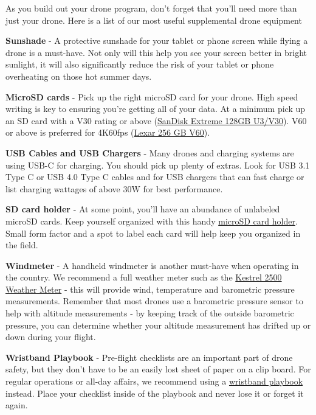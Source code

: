 \documentclass[
  12pt,
]{book}
\begin{document}
As you build out your drone program, don't forget that you'll need more than just your drone. Here is a list of our most useful supplemental drone equipment

\textbf{Sunshade} - A protective sunshade for your tablet or phone screen while flying a drone is a must-have. Not only will this help you see your screen better in bright sunlight, it will also significantly reduce the risk of your tablet or phone overheating on those hot summer days.

\textbf{MicroSD cards} - Pick up the right microSD card for your drone. High speed writing is key to ensuring you're getting all of your data. At a minimum pick up an SD card with a V30 rating or above (\href{https://www.amazon.com/SanDisk-Extreme-microSDXC-Memory-Adapter/dp/B07FCMKK5X?th=1}{SanDisk Extreme 128GB U3/V30}). V60 or above is preferred for 4K60fps (\href{https://www.amazon.com/Lexar-microSDXC-Professional-Adapter-Class10/dp/B09FJHMLC6/}{Lexar 256 GB V60}).

\textbf{USB Cables and USB Chargers} - Many drones and charging systems are using USB-C for charging. You should pick up plenty of extras. Look for USB 3.1 Type C or USB 4.0 Type C cables and for USB chargers that can fast charge or list charging wattages of above 30W for best performance.

\textbf{SD card holder} - At some point, you'll have an abundance of unlabeled microSD cards. Keep yourself organized with this handy \href{https://www.amazon.com/Holder-Storage-Organizer-Lightweight-Portable/dp/B07T6SWXK5/}{microSD card holder}. Small form factor and a spot to label each card will help keep you organized in the field.

\textbf{Windmeter} - A handheld windmeter is another must-have when operating in the country. We recommend a full weather meter such as the \href{https://kestrelmeters.com/collections/all-kestrel-meters/products/kestrel-2500-weather-meter}{Kestrel 2500 Weather Meter} - this will provide wind, temperature and barometric pressure measurements. Remember that most drones use a barometric pressure sensor to help with altitude measurements - by keeping track of the outside barometric pressure, you can determine whether your altitude measurement has drifted up or down during your flight.

\textbf{Wristband Playbook} - Pre-flight checklists are an important part of drone safety, but they don't have to be an easily lost sheet of paper on a clip board. For regular operations or all-day affairs, we recommend using a \href{https://www.amazon.com/dp/B01DJJW8QW}{wristband playbook} instead. Place your checklist inside of the playbook and never lose it or forget it again.
\end{document}

